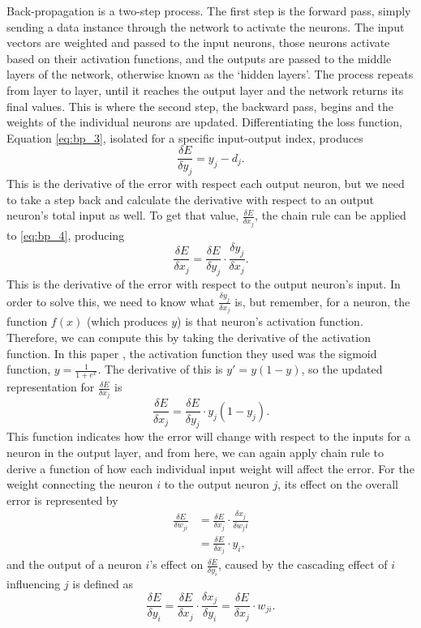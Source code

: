 \documentclass[11pt,a4paper,oldfontcommands]{memoir}
\begin{document}
Back-propagation is a two-step process. The first step is the forward pass, simply sending a data instance through the network to activate the neurons. The input vectors are weighted and passed to the input neurons, those neurons activate based on their activation functions, and the outputs are passed to the middle layers of the network, otherwise known as the `hidden layers'. The process repeats from layer to layer, until it reaches the output layer and the network returns its final values. This is where the second step, the backward pass, begins and the weights of the individual neurons are updated. Differentiating the loss function, Equation \ref{eq:bp_3}, isolated for a specific input-output index, produces
\begin{equation}
    \frac{\delta E}{\delta y_j} = y_j - d_j .
    \label{eq:bp_4}
\end{equation}
This is the derivative of the error with respect each output neuron, but we need to take a step back and calculate the derivative with respect to an output neuron's total input as well. To get that value, $\frac{\delta E}{\delta x_j}$, the chain rule can be applied to \ref{eq:bp_4}, producing
\begin{equation}
    \frac{\delta E}{\delta x_j} = \frac{\delta E}{\delta y_j} \cdot \frac{\delta y_j}{\delta x_j} .
    \label{eq:bp_4_2}
\end{equation}
This is the derivative of the error with respect to the output neuron's input. In order to solve this, we need to know what $\frac{\delta y_j}{\delta x_j}$ is, but remember, for a neuron, the function $f(x)$ (which produces $y$) is that neuron's activation function. Therefore, we can compute this by taking the derivative of the activation function. In this paper \cite{backprop}, the activation function they used was the sigmoid function, $y = \frac{1}{1 + e^{x}}$. The derivative of this is $y' = y(1-y)$, so the updated representation for $\frac{\delta E}{\delta x_j}$ is
\begin{equation}
    \frac{\delta E}{\delta x_j} = \frac{\delta E}{\delta y_j} \cdot y_j(1-y_j) .
    \label{eq:bp_5}
\end{equation}
This function indicates how the error will change with respect to the inputs for a neuron in the output layer, and from here, we can again apply chain rule to derive a function of how each individual input weight will affect the error. For the weight connecting the neuron $i$ to the output neuron $j$, its effect on the overall error is represented by
\begin{align}
    \frac{\delta E}{\delta w_{ji}}
    & = \frac{\delta E}{\delta x_j} \cdot \frac{\delta x_j}{\delta w_ji} \\
    & = \frac{\delta E}{\delta x_j} \cdot y_i ,
    \label{eq:bp_6}
\end{align}
and the output of a neuron $i$'s effect on $\frac{\delta E}{\delta y_i}$, caused by the cascading effect of $i$ influencing $j$ is defined as
\begin{equation}
    \frac{\delta E}{\delta y_i} = \frac{\delta E}{\delta x_j} \cdot \frac{\delta x_j}{\delta y_i} = \frac{\delta E}{\delta x_j} \cdot w_{ji} .
    \label{eq:bp_6_2}
\end{equation}
\end{document}
